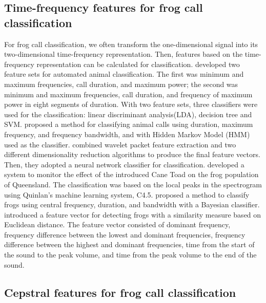 \subsection{Time-frequency features for frog call classification}

For frog call classification, we often transform the one-dimensional signal into its two-dimensional time-frequency representation. Then, features based on the time-frequency representation can be calculated for classification.
\cite{acevedo2009automated} developed two feature sets for automated animal classification. The first was minimum and maximum frequencies, call duration, and maximum power; the second was minimum and maximum frequencies, call duration, and frequency of maximum power in eight segments of duration. With two feature sets, three classifiers were used for the classification: linear discriminant analysis(LDA), decision tree and SVM. \cite{brandes2008feature} proposed a method for classifying animal calls using duration, maximum frequency, and frequency bandwidth, and with Hidden Markov Model (HMM) used as the classifier. \cite{yen2002automatic} combined wavelet packet feature extraction and two different dimensionality reduction algorithms to produce the final feature vectors. Then, they adopted a neural network classifier for classification. \cite{grigg1996monitoring} developed a system to monitor the effect of the introduced Cane Toad on the frog population of Queensland. The classification was based on the local peaks in the spectrogram using Quinlan's machine learning system, C4.5. \cite{Brandes2006} proposed a method to classify frogs using central frequency, duration, and bandwidth with a Bayesian classifier. \cite{croker2012using} introduced a feature vector for detecting frogs with a similarity measure based on Euclidean distance. The feature vector consisted of dominant frequency, frequency difference between the lowest and dominant frequencies, frequency difference between the highest and dominant frequencies, time from the start of the sound to the peak volume, and time from the peak volume to the end of the sound. 
 


\subsection{Cepstral features for frog call classification}

